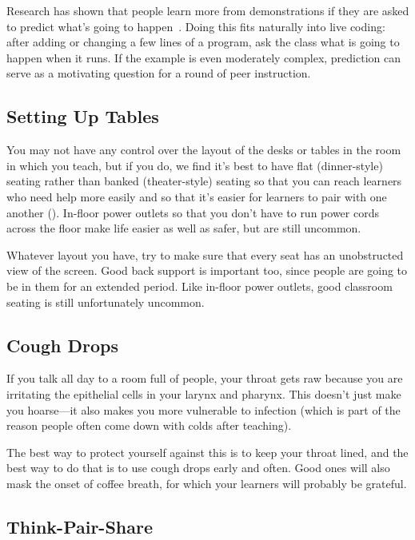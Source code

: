 Research has shown that people learn more from demonstrations
if they are asked to predict what's going to happen~\cite{Mill2013}.
Doing this fits naturally into live coding:
after adding or changing a few lines of a program,
ask the class what is going to happen when it runs.
If the example is even moderately complex,
prediction can serve as a motivating question for a round of peer instruction.

\subsection*{Setting Up Tables}

You may not have any control over the layout of the desks or tables
in the room in which you teach,
but if you do,
we find it's best to have flat (dinner-style) seating
rather than banked (theater-style) seating
so that you can reach learners who need help more easily
and so that it's easier for learners to pair with one another ().
In-floor power outlets so that you don't have to run power cords across the floor
make life easier as well as safer,
but are still uncommon.

Whatever layout you have,
try to make sure that every seat has an unobstructed view of the screen.
Good back support is important too,
since people are going to be in them for an extended period.
Like in-floor power outlets,
good classroom seating is still unfortunately uncommon.

\subsection*{Cough Drops}

If you talk all day to a room full of people,
your throat gets raw because you are irritating the epithelial cells in your larynx and pharynx.
This doesn't just make you hoarse---it also makes you more vulnerable to infection
(which is part of the reason people often come down with colds after teaching).

The best way to protect yourself against this is to keep your throat lined,
and the best way to do that is to use cough drops early and often.
Good ones will also mask the onset of coffee breath,
for which your learners will probably be grateful.

\subsection*{Think-Pair-Share}

